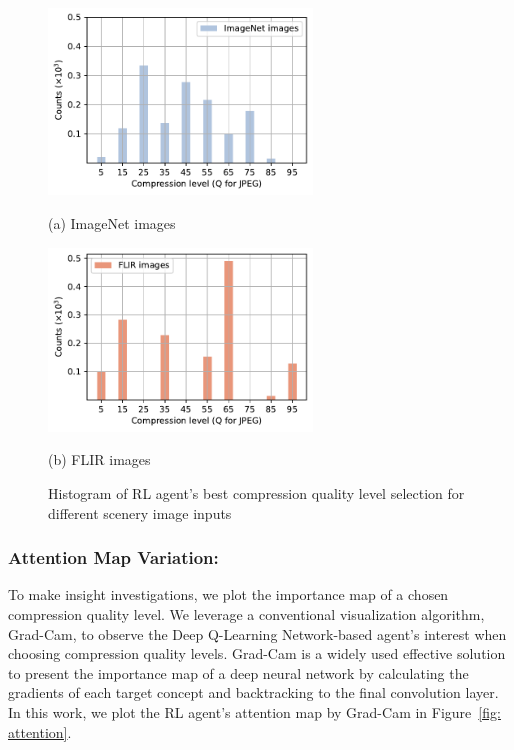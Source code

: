\begin{figure}[!t]
{\color{revise}
	\begin{minipage}[t]{0.48\linewidth}
		\centerline{\includegraphics[width=7cm]{figures/ImageNet_Baidu_choices.pdf}}
		\centerline{(a) ImageNet images}
	\end{minipage}
	\hfill
	\begin{minipage}[t]{0.48\linewidth}
		\centerline{\includegraphics[width=7cm]{figures/FLIR_Baidu_choices.pdf}}
		\centerline{(b) FLIR images}
	\end{minipage}	
    \caption{\textcolor{revise}{Histogram of RL agent's best compression quality level selection for different scenery image inputs}}
	\label{fig: dataset_change}
}
\end{figure}

\subsubsection{Attention Map Variation:}
\label{subsec: attention map}

To make insight investigations, we plot the importance map of a chosen compression quality level. We leverage a conventional visualization algorithm, Grad-Cam, to observe the Deep Q-Learning Network-based agent's interest when choosing compression quality levels. Grad-Cam is a widely used effective solution to present the importance map of a deep neural network by calculating the gradients of each target concept and backtracking to the final convolution layer. In this work, we plot the RL agent's attention map by Grad-Cam in Figure~\ref{fig: attention}. %

